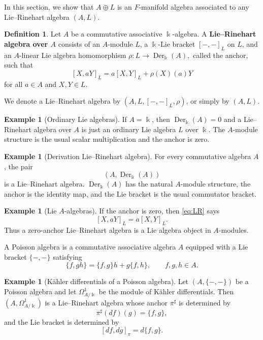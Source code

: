 \documentclass[12pt,reqno]{amsart}
\theoremstyle{definition}
\newtheorem{definition}[theorem]{Definition}
\newtheorem{example}[theorem]{Example}
\theoremstyle{remark}
\newcommand{\kk}{\Bbbk}
\newcommand{\Der}{\operatorname{Der}}
\begin{document}
	In this section, we show that $A\oplus L$ is an \texorpdfstring{$F$}{F}-manifold algebra associated to any Lie--Rinehart algebra $(A,L)$.
	
	\begin{definition}
		Let $A$ be a commutative associative $\kk$-algebra.  A \textbf{Lie--Rinehart
			algebra over $A$} consists of an $A$-module $L$, a $\kk$-Lie bracket
		$[-,-]_L$ on $L$, and an $A$-linear Lie algebra homomorphism
		$
		\rho:L\longrightarrow \Der_{\kk}(A),
		$
		called the anchor, such that
		\begin{equation}\label{eq:LR}
			[X,aY]_L=a[X,Y]_L+\rho(X)(a)Y
		\end{equation}
		for all $a\in A$ and $X,Y\in L$.
	\end{definition}
	
	We denote a Lie--Rinehart algebra by $(A,L,[-,-]_L,\rho)$, or simply by
	$(A,L)$.
	
	
	
	\begin{example}[Ordinary Lie algebras]
		If $A=\kk$, then $\Der_\kk(A)=0$ and a Lie--Rinehart algebra over $A$ is
		just an ordinary Lie algebra $L$ over $\kk$.  The $A$-module structure is the
		usual scalar multiplication and the anchor is zero.
	\end{example}
	
	\begin{example}[Derivation Lie--Rinehart algebra]
		For every commutative algebra $A$, the pair
		\[
		(A,\Der_\kk(A))
		\]
		is a Lie--Rinehart algebra.  $\Der_\kk(A)$ has the natural $A$-module structure, the
		anchor is the identity map, and the Lie bracket is the usual commutator
		bracket.
	\end{example}
	
	\begin{example}[Lie $A$-algebras]
		If the anchor is zero, then \eqref{eq:LR} says
		\[
		[X,aY]_L=a[X,Y]_L.
		\]
		Thus a zero-anchor Lie--Rinehart algebra is a Lie algebra object in
		$A$-modules.
	\end{example}
	
	A Poisson algebra is a commutative associative algebra $A$ equipped with a
	Lie bracket $\{-,-\}$ satisfying
	\[
	\{f,gh\}=\{f,g\}h+g\{f,h\},
	\qquad f,g,h\in A.
	\]
	
	\begin{example}[K\"ahler differentials of a Poisson algebra]
		Let $(A,\{-,-\})$ be a Poisson algebra and let $\Omega^1_{A/\kk}$ be the
		module of K\"ahler differentials.  Then $(A,\Omega^1_{A/\kk})$ is a
		Lie--Rinehart algebra whose anchor $\pi^\sharp$ is determined by
		\[
		\pi^\sharp(df)(g)=\{f,g\},
		\]
		and the Lie bracket is determined by
		\[
		[df,dg]_\pi=d\{f,g\}.
		\]
	\end{example}
	
\end{document}
